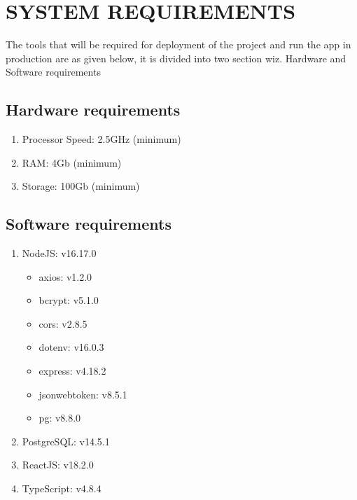 \section{SYSTEM REQUIREMENTS}

The tools that will be required for deployment of the project and run the app
in production are as given below, it is divided into two section wiz. Hardware
and Software requirements

\subsection{Hardware requirements}
\begin{enumerate}
    \item Processor Speed: 2.5GHz (minimum)
    \item RAM: 4Gb (minimum)
    \item Storage: 100Gb (minimum)
\end{enumerate}

\subsection{Software requirements}
\begin{enumerate}
    \item NodeJS: v16.17.0
        \begin{itemize}
            \item axios: v1.2.0
            \item bcrypt: v5.1.0
            \item cors: v2.8.5
            \item dotenv: v16.0.3
            \item express: v4.18.2
            \item jsonwebtoken: v8.5.1
            \item pg: v8.8.0
        \end{itemize}
    \item PostgreSQL: v14.5.1
    \item ReactJS: v18.2.0
    \item TypeScript: v4.8.4
\end{enumerate}
